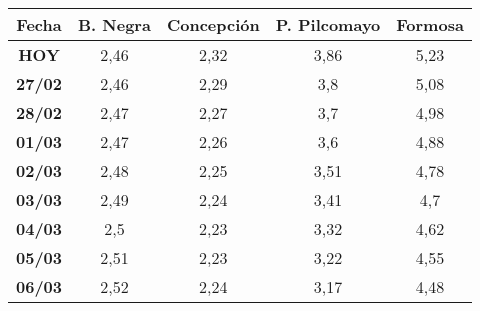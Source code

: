 \begin{tabular}{|c|c|c|c|c|}
\hline
\textbf{Fecha} & \textbf{B. Negra} & \textbf{Concepción} & \textbf{P. Pilcomayo} & \textbf{Formosa} \\
\hline
\textbf{HOY} &  2,46 &  2,32 &  3,86 &  5,23 \\
\hline
\textbf{27/02} &  2,46 &  2,29 &  3,8 &  5,08 \\
\hline
\textbf{28/02} &  2,47 &  2,27 &  3,7 &  4,98 \\
\hline
\textbf{01/03} &  2,47 &  2,26 &  3,6 &  4,88 \\
\hline
\textbf{02/03} &  2,48 &  2,25 &  3,51 &  4,78 \\
\hline
\textbf{03/03} &  2,49 &  2,24 &  3,41 &  4,7 \\
\hline
\textbf{04/03} &  2,5 &  2,23 &  3,32 &  4,62 \\
\hline
\textbf{05/03} &  2,51 &  2,23 &  3,22 &  4,55 \\
\hline
\textbf{06/03} &  2,52 &  2,24 &  3,17 &  4,48 \\
\hline
\end{tabular}